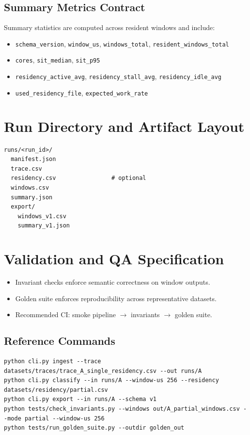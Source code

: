 \documentclass[11pt,a4paper]{article}
\begin{document}
\subsection{Summary Metrics Contract}
Summary statistics are computed across resident windows and include:
\begin{itemize}[leftmargin=1.4em]
  \item \texttt{schema\_version}, \texttt{window\_us}, \texttt{windows\_total}, \texttt{resident\_windows\_total}
  \item \texttt{cores}, \texttt{sit\_median}, \texttt{sit\_p95}
  \item \texttt{residency\_active\_avg}, \texttt{residency\_stall\_avg}, \texttt{residency\_idle\_avg}
  \item \texttt{used\_residency\_file}, \texttt{expected\_work\_rate}
\end{itemize}

\section{Run Directory and Artifact Layout}
\begin{lstlisting}[basicstyle=\ttfamily\small,frame=single]
runs/<run_id>/
  manifest.json
  trace.csv
  residency.csv                # optional
  windows.csv
  summary.json
  export/
    windows_v1.csv
    summary_v1.json
\end{lstlisting}

\section{Validation and QA Specification}
\begin{itemize}[leftmargin=1.4em]
  \item Invariant checks enforce semantic correctness on window outputs.
  \item Golden suite enforces reproducibility across representative datasets.
  \item Recommended CI: smoke pipeline $\rightarrow$ invariants $\rightarrow$ golden suite.
\end{itemize}

\subsection{Reference Commands}
\begin{lstlisting}[basicstyle=\ttfamily\small,frame=single]
python cli.py ingest --trace datasets/traces/trace_A_single_residency.csv --out runs/A
python cli.py classify --in runs/A --window-us 256 --residency datasets/residency/partial.csv
python cli.py export --in runs/A --schema v1
python tests/check_invariants.py --windows out/A_partial_windows.csv --mode partial --window-us 256
python tests/run_golden_suite.py --outdir golden_out
\end{lstlisting}
\end{document}
